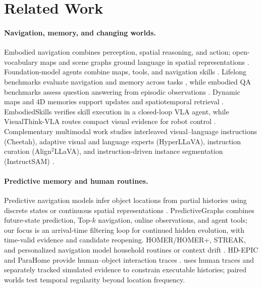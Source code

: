 \section{Related Work}
\label{sec:related_work}

\paragraph{Navigation, memory, and changing worlds.}
Embodied navigation combines perception, spatial reasoning, and action;
open-vocabulary maps and scene graphs ground language in spatial representations
\citep{anderson2018evaluation,savva2019habitat,chaplot2020objectnav,
xin2026agentvln,huang2023vlmaps,gu2024conceptgraphs,werby2024hovsg,
Li_2026_CVPR,huang2026msgnav}. Foundation-model agents combine maps, tools, and
navigation skills
\citep{yokoyama2024vlfm,long2024instructnav,ziliotto2025tango,
li2026agenticnav,zheng2021cos,ginting2024seek,zhang2025apexnav}. Lifelong
benchmarks evaluate navigation and memory across tasks
\citep{khanna2024goatbench,yadav2025findingdory}, while embodied QA benchmarks
assess question answering from episodic observations
\citep{majumdar2024openeqa}. Dynamic maps and 4D memories support updates and
spatiotemporal retrieval
\citep{sohn2025r4,gorlo2026describe,bescos2018dynaslam,
narayana2020lifelong,liu2024dynamem}. EmbodiedSkills verifies skill
execution in a closed-loop VLA agent, while VisualThink-VLA routes compact
visual evidence for robot control
\citep{wang2026embodiedskills,gao2026visualthinkvla}.
Complementary multimodal work studies interleaved visual--language
instructions (Cheetah), adaptive visual and language experts (HyperLLaVA),
instruction curation (Align$^2$LLaVA), and instruction-driven instance
segmentation (InstructSAM)
\citep{li2024cheetah,zhang2024hyperllava,huang2024align2llava,
yuan2026instructsam}.

\paragraph{Predictive memory and human routines.}
Predictive navigation models infer object locations from partial histories
using discrete states or continuous spatial representations
\citep{kurenkov2023dynamic,saavedraruiz2026predictivegraphs,
argenziano2026flowmaps}. PredictiveGraphs combines future-state
prediction, Top-$k$ navigation, online observations, and agent tools; our
focus is an arrival-time filtering loop for continued hidden
evolution, with time-valid evidence and candidate reopening. HOMER/HOMER+,
STREAK, and personalized navigation model household routines or context drift
\citep{patel2023homer,patel2023routine,bartoli2025streak,zhang2026ucon}.
HD-EPIC and ParaHome provide human--object interaction traces
\citep{perrett2025hdepic,kim2025parahome}. \evolvingworldbench{} uses human traces and
separately tracked simulated evidence to constrain executable histories; paired
worlds test temporal regularity beyond location frequency.
